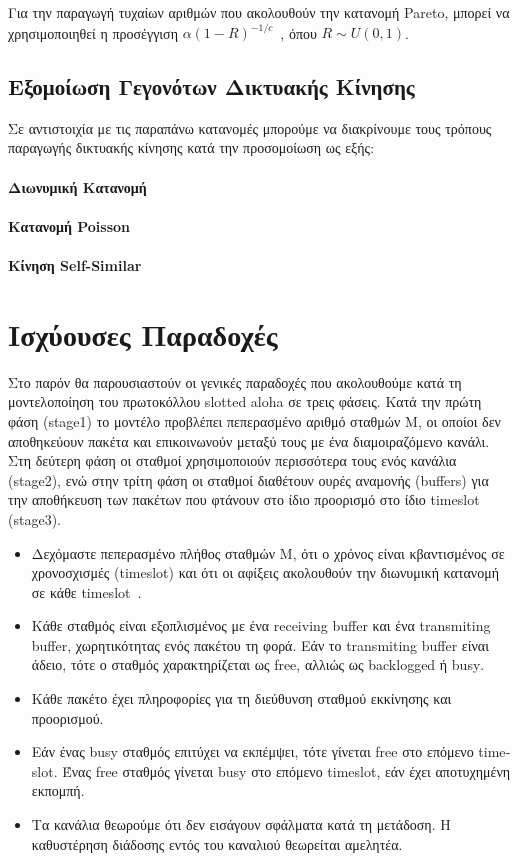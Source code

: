 \documentclass[12pt]{report}
\begin{document}
Για την παραγωγή τυχαίων αριθμών που ακολουθούν την κατανομή \textlatin{Pareto}, μπορεί να χρησιμοποιηθεί η προσέγγιση \(\alpha(1-R)^{-1/c}\)~\cite{book:07}, όπου \(R \sim U(0, 1)\).

\subsection{Εξομοίωση Γεγονότων Δικτυακής Κίνησης}
Σε αντιστοιχία με τις παραπάνω κατανομές μπορούμε να διακρίνουμε τους τρόπους παραγωγής δικτυακής κίνησης κατά την προσομοίωση ως εξής:
\paragraph{Διωνυμική Κατανομή}
\paragraph{Κατανομή \textlatin{Poisson}}
\paragraph{Κίνηση \textlatin{Self-Similar}}


\section{Ισχύουσες Παραδοχές}\label{sec2.1}
Στο παρόν θα παρουσιαστούν οι γενικές παραδοχές που ακολουθούμε κατά τη μοντελοποίηση του πρωτοκόλλου \textlatin{slotted aloha} σε τρεις φάσεις. Κατά την πρώτη φάση (\textlatin{stage1}) το μοντέλο προβλέπει πεπερασμένο αριθμό σταθμών \textlatin{M}, οι οποίοι δεν αποθηκεύουν πακέτα και επικοινωνούν μεταξύ τους με ένα διαμοιραζόμενο κανάλι. Στη δεύτερη φάση οι σταθμοί χρησιμοποιούν περισσότερα τους ενός κανάλια (\textlatin{stage2}), ενώ στην τρίτη φάση οι σταθμοί διαθέτουν ουρές αναμονής (\textlatin{buffers}) για την αποθήκευση των πακέτων που φτάνουν στο ίδιο προορισμό στο ίδιο \textlatin{timeslot} (\textlatin{stage3}).
\begin{itemize}
	\item Δεχόμαστε πεπερασμένο πλήθος σταθμών \textlatin{M}, ότι ο χρόνος είναι κβαντισμένος σε χρονοσχισμές (\textlatin{timeslot}) και ότι οι αφίξεις ακολουθούν την διωνυμική κατανομή σε κάθε \textlatin{timeslot}~\cite{book:01}. 
	\item Κάθε σταθμός είναι εξοπλισμένος με ένα \textlatin{receiving buffer} και ένα \textlatin{transmiting buffer}, χωρητικότητας ενός πακέτου τη φορά. Εάν το \textlatin{transmiting buffer} είναι άδειο, τότε ο σταθμός χαρακτηρίζεται ως \textlatin{free}, αλλιώς ως \textlatin{backlogged} ή \textlatin{busy}.
	\item Κάθε πακέτο έχει πληροφορίες για τη διεύθυνση σταθμού εκκίνησης και προορισμού.
	\item Εάν ένας \textlatin{busy} σταθμός επιτύχει να εκπέμψει, τότε γίνεται \textlatin{free} στο επόμενο \textlatin{timeslot}. Ένας \textlatin{free} σταθμός γίνεται \textlatin{busy} στο επόμενο \textlatin{timeslot}, εάν έχει αποτυχημένη εκπομπή.
	\item Τα κανάλια θεωρούμε ότι δεν εισάγουν σφάλματα κατά τη μετάδοση. Η καθυστέρηση διάδοσης εντός του καναλιού θεωρείται αμελητέα.
\end{itemize}
\end{document}
